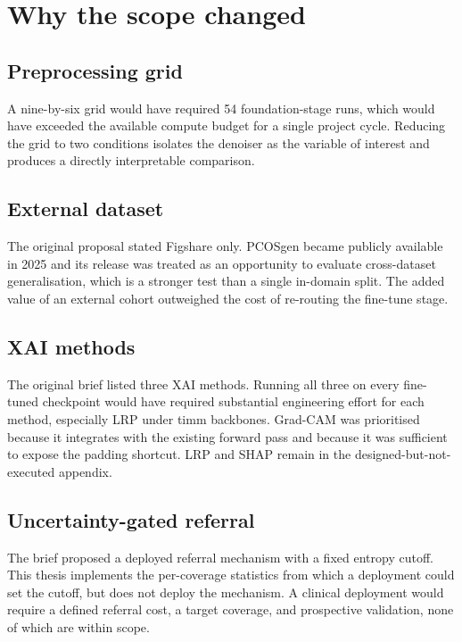 \documentclass[../preamble.tex]{subfiles}
\begin{document}
\section{Why the scope changed}
\label{app:scope-why}

\subsection*{Preprocessing grid}

A nine-by-six grid would have required 54 foundation-stage runs, which would
have exceeded the available compute budget for a single project cycle.
Reducing the grid to two conditions isolates the denoiser as the variable
of interest and produces a directly interpretable comparison.

\subsection*{External dataset}

The original proposal stated Figshare only. PCOSgen became publicly available
in 2025 and its release was treated as an opportunity to evaluate
cross-dataset generalisation, which is a stronger test than a single
in-domain split. The added value of an external cohort outweighed the cost
of re-routing the fine-tune stage.

\subsection*{XAI methods}

The original brief listed three XAI methods. Running all three on every
fine-tuned checkpoint would have required substantial engineering effort for
each method, especially LRP under timm backbones. Grad-CAM was prioritised
because it integrates with the existing forward pass and because it was
sufficient to expose the padding shortcut. LRP and SHAP remain in the
designed-but-not-executed appendix.

\subsection*{Uncertainty-gated referral}

The brief proposed a deployed referral mechanism with a fixed entropy
cutoff. This thesis implements the per-coverage statistics from which a
deployment could set the cutoff, but does not deploy the mechanism. A
clinical deployment would require a defined referral cost, a target
coverage, and prospective validation, none of which are within scope.
\end{document}
